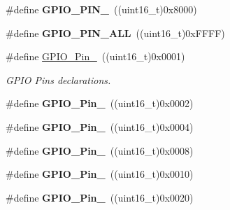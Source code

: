 \begin{DoxyCompactItemize}
\item 
\hypertarget{group___t_m___g_p_i_o___macros_ga77be5756e80bcdf18e1aa39b35d1d640}{}\#define {\bfseries G\+P\+I\+O\+\_\+\+P\+I\+N\+\_}~((uint16\+\_\+t)0x8000)\label{group___t_m___g_p_i_o___macros_ga77be5756e80bcdf18e1aa39b35d1d640}

\item 
\hypertarget{group___t_m___g_p_i_o___macros_gada8dca690b8e25529328ecf92e8fd1a5}{}\#define {\bfseries G\+P\+I\+O\+\_\+\+P\+I\+N\+\_\+\+A\+L\+L}~((uint16\+\_\+t)0x\+F\+F\+F\+F)\label{group___t_m___g_p_i_o___macros_gada8dca690b8e25529328ecf92e8fd1a5}

\item 
\#define \hyperlink{group___t_m___g_p_i_o___macros_gab305b8d1be9f89bf2b4a05589b456049}{G\+P\+I\+O\+\_\+\+Pin\+\_}~((uint16\+\_\+t)0x0001)
\begin{DoxyCompactList}\small\item\em G\+P\+I\+O Pins declarations. \end{DoxyCompactList}\item 
\hypertarget{group___t_m___g_p_i_o___macros_ga29db642c26f1fa0fffc3ecadcd30f82b}{}\#define {\bfseries G\+P\+I\+O\+\_\+\+Pin\+\_}~((uint16\+\_\+t)0x0002)\label{group___t_m___g_p_i_o___macros_ga29db642c26f1fa0fffc3ecadcd30f82b}

\item 
\hypertarget{group___t_m___g_p_i_o___macros_gabdf6630324b2f99360537a310687187c}{}\#define {\bfseries G\+P\+I\+O\+\_\+\+Pin\+\_}~((uint16\+\_\+t)0x0004)\label{group___t_m___g_p_i_o___macros_gabdf6630324b2f99360537a310687187c}

\item 
\hypertarget{group___t_m___g_p_i_o___macros_ga763c6544859dbe28cd3f8ad820045556}{}\#define {\bfseries G\+P\+I\+O\+\_\+\+Pin\+\_}~((uint16\+\_\+t)0x0008)\label{group___t_m___g_p_i_o___macros_ga763c6544859dbe28cd3f8ad820045556}

\item 
\hypertarget{group___t_m___g_p_i_o___macros_gacbf04d09b954606cdcc55eb2e81780e3}{}\#define {\bfseries G\+P\+I\+O\+\_\+\+Pin\+\_}~((uint16\+\_\+t)0x0010)\label{group___t_m___g_p_i_o___macros_gacbf04d09b954606cdcc55eb2e81780e3}

\item 
\hypertarget{group___t_m___g_p_i_o___macros_ga32dbe930f52ce5ab60190c65e9dc741e}{}\#define {\bfseries G\+P\+I\+O\+\_\+\+Pin\+\_}~((uint16\+\_\+t)0x0020)\label{group___t_m___g_p_i_o___macros_ga32dbe930f52ce5ab60190c65e9dc741e}


\end{DoxyCompactItemize}
